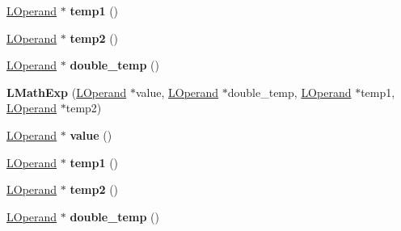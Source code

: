 \begin{DoxyCompactItemize}
\item 
\hyperlink{classv8_1_1internal_1_1_l_operand}{L\+Operand} $\ast$ {\bfseries temp1} ()\hypertarget{classv8_1_1internal_1_1_l_math_exp_a430c8c030cbaad33b264a77b03e0db75}{}\label{classv8_1_1internal_1_1_l_math_exp_a430c8c030cbaad33b264a77b03e0db75}

\item 
\hyperlink{classv8_1_1internal_1_1_l_operand}{L\+Operand} $\ast$ {\bfseries temp2} ()\hypertarget{classv8_1_1internal_1_1_l_math_exp_adb7bff0a3a668396d3393908dab289df}{}\label{classv8_1_1internal_1_1_l_math_exp_adb7bff0a3a668396d3393908dab289df}

\item 
\hyperlink{classv8_1_1internal_1_1_l_operand}{L\+Operand} $\ast$ {\bfseries double\+\_\+temp} ()\hypertarget{classv8_1_1internal_1_1_l_math_exp_a60d7d35b6ddd8f46774958dce30597dc}{}\label{classv8_1_1internal_1_1_l_math_exp_a60d7d35b6ddd8f46774958dce30597dc}

\item 
{\bfseries L\+Math\+Exp} (\hyperlink{classv8_1_1internal_1_1_l_operand}{L\+Operand} $\ast$value, \hyperlink{classv8_1_1internal_1_1_l_operand}{L\+Operand} $\ast$double\+\_\+temp, \hyperlink{classv8_1_1internal_1_1_l_operand}{L\+Operand} $\ast$temp1, \hyperlink{classv8_1_1internal_1_1_l_operand}{L\+Operand} $\ast$temp2)\hypertarget{classv8_1_1internal_1_1_l_math_exp_a558e5fb429ca96f45fce9f078a8fa0f6}{}\label{classv8_1_1internal_1_1_l_math_exp_a558e5fb429ca96f45fce9f078a8fa0f6}

\item 
\hyperlink{classv8_1_1internal_1_1_l_operand}{L\+Operand} $\ast$ {\bfseries value} ()\hypertarget{classv8_1_1internal_1_1_l_math_exp_a59d6185f1b9e035a269046376b4432b8}{}\label{classv8_1_1internal_1_1_l_math_exp_a59d6185f1b9e035a269046376b4432b8}

\item 
\hyperlink{classv8_1_1internal_1_1_l_operand}{L\+Operand} $\ast$ {\bfseries temp1} ()\hypertarget{classv8_1_1internal_1_1_l_math_exp_a430c8c030cbaad33b264a77b03e0db75}{}\label{classv8_1_1internal_1_1_l_math_exp_a430c8c030cbaad33b264a77b03e0db75}

\item 
\hyperlink{classv8_1_1internal_1_1_l_operand}{L\+Operand} $\ast$ {\bfseries temp2} ()\hypertarget{classv8_1_1internal_1_1_l_math_exp_adb7bff0a3a668396d3393908dab289df}{}\label{classv8_1_1internal_1_1_l_math_exp_adb7bff0a3a668396d3393908dab289df}

\item 
\hyperlink{classv8_1_1internal_1_1_l_operand}{L\+Operand} $\ast$ {\bfseries double\+\_\+temp} ()\hypertarget{classv8_1_1internal_1_1_l_math_exp_a60d7d35b6ddd8f46774958dce30597dc}{}\label{classv8_1_1internal_1_1_l_math_exp_a60d7d35b6ddd8f46774958dce30597dc}


\end{DoxyCompactItemize}
